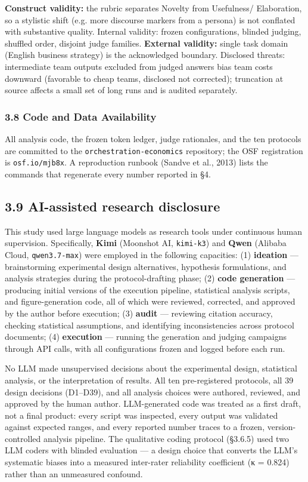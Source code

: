 \documentclass[11pt,a4paper]{article}
\begin{document}
\textbf{Construct validity:} the rubric separates Novelty from Usefulness/
Elaboration, so a stylistic shift (e.g. more discourse markers from a
persona) is not conflated with substantive quality. \textit{}Internal
validity:\textit{} frozen configurations, blinded judging, shuffled order,
disjoint judge families. \textbf{External validity:} single task domain
(English business strategy) is the acknowledged boundary. \textit{}Disclosed
threats:\textit{} intermediate team outputs excluded from judged answers bias
team costs downward (favorable to cheap teams, disclosed not
corrected); truncation at source affects a small set of long runs and
is audited separately.

\subsubsection{3.8 Code and Data Availability}

All analysis code, the frozen token ledger, judge rationales, and the
ten protocols are committed to the \texttt{orchestration-economics}
repository; the OSF registration is \texttt{osf.io/mjb8x}. A reproduction
runbook (Sandve et al., 2013) lists the commands that regenerate every
number reported in §4.

\subsection{3.9 AI-assisted research disclosure}

This study used large language models as research tools under continuous
human supervision. Specifically, \textbf{Kimi} (Moonshot AI, \texttt{kimi-k3}) and
\textbf{Qwen} (Alibaba Cloud, \texttt{qwen3.7-max}) were employed in the following
capacities: (1) \textbf{ideation} — brainstorming experimental design
alternatives, hypothesis formulations, and analysis strategies during
the protocol-drafting phase; (2) \textbf{code generation} — producing initial
versions of the execution pipeline, statistical analysis scripts, and
figure-generation code, all of which were reviewed, corrected, and
approved by the author before execution; (3) \textbf{audit} — reviewing
citation accuracy, checking statistical assumptions, and identifying
inconsistencies across protocol documents; (4) \textbf{execution} — running
the generation and judging campaigns through API calls, with all
configurations frozen and logged before each run.

No LLM made unsupervised decisions about the experimental design,
statistical analysis, or the interpretation of results. All ten
pre-registered protocols, all 39 design decisions (D1–D39), and all
analysis choices were authored, reviewed, and approved by the human
author. LLM-generated code was treated as a first draft, not a final
product: every script was inspected, every output was validated against
expected ranges, and every reported number traces to a frozen,
version-controlled analysis pipeline. The qualitative coding protocol
(§3.6.5) used two LLM coders with blinded evaluation — a design choice
that converts the LLM's systematic biases into a measured inter-rater
reliability coefficient (κ = 0.824) rather than an unmeasured confound.
\end{document}
